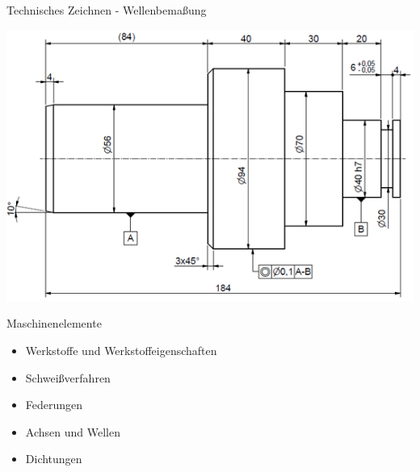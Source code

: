\documentclass[11pt]{beamer}
\begin{document}





\begin{frame}{Technisches Zeichnen - Wellenbemaßung}

\begin{center}
\includegraphics[scale=0.5]{welle.png}
\end{center}

	
\end{frame}











\begin{frame}{Maschinenelemente}
	
\begin{itemize}
\item Werkstoffe und Werkstoffeigenschaften
\item Schweißverfahren
\item Federungen
\item Achsen und Wellen
\item Dichtungen
\end{itemize}
	
	
\end{frame}
\end{document}
